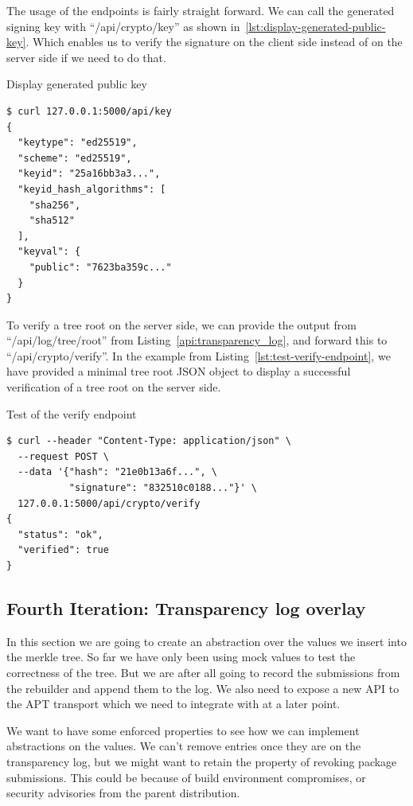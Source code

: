 \documentclass[../Main/thesis.tex]{subfiles}
\begin{document}
The usage of the endpoints is fairly straight forward. We can call the generated
signing key with ``/api/crypto/key'' as shown
in~\ref{lst:display-generated-public-key}. Which enables us to verify the
signature on the client side instead of on the server side if we need to do
that.

\begin{listing}[H]
\caption{Display generated public key}
\label{lst:display-generated-public-key}
\begin{verbatim}
$ curl 127.0.0.1:5000/api/key
{
  "keytype": "ed25519",
  "scheme": "ed25519",
  "keyid": "25a16bb3a3...",
  "keyid_hash_algorithms": [
    "sha256",
    "sha512"
  ],
  "keyval": {
    "public": "7623ba359c..."
  }
}
\end{verbatim}
\end{listing}

To verify a tree root on the server side, we can provide the output from
``/api/log/tree/root'' from Listing~\ref{api:transparency_log}, and forward this
to ``/api/crypto/verify''. In the example from
Listing~\ref{lst:test-verify-endpoint}, we have provided a minimal tree root
JSON object to display a successful verification of a tree root on the server
side.

\begin{listing}[H]
\caption{Test of the verify endpoint}
\label{lst:test-verify-endpoint}
\begin{verbatim}
$ curl --header "Content-Type: application/json" \
  --request POST \
  --data '{"hash": "21e0b13a6f...", \
           "signature": "832510c0188..."}' \
  127.0.0.1:5000/api/crypto/verify
{
  "status": "ok",
  "verified": true
}
\end{verbatim}
\end{listing}


\subsection{Fourth Iteration: Transparency log overlay}%
\label{sub:transparency_overlay}
In this section we are going to create an abstraction over the values we insert
into the merkle tree. So far we have only been using mock values to test the
correctness of the tree. But we are after all going to record the submissions
from the rebuilder and append them to the log. We also need to expose a new API
to the APT transport which we need to integrate with at a later point.

We want to have some enforced properties to see how we can implement
abstractions on the values. We can't remove entries once they are on the
transparency log, but we might want to retain the property of revoking package
submissions. This could be because of build environment compromises, or security
advisories from the parent distribution.
\end{document}
